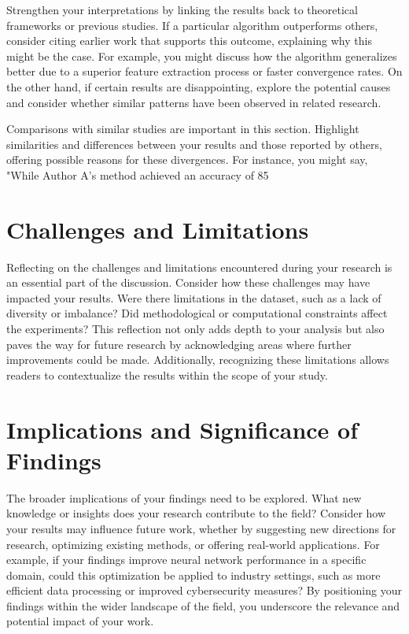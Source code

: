 \documentclass{iutbscthesis}
\begin{document}
Strengthen your interpretations by linking the results back to theoretical frameworks or previous studies. If a particular algorithm outperforms others, consider citing earlier work that supports this outcome, explaining why this might be the case. For example, you might discuss how the algorithm generalizes better due to a superior feature extraction process or faster convergence rates. On the other hand, if certain results are disappointing, explore the potential causes and consider whether similar patterns have been observed in related research.

Comparisons with similar studies are important in this section. Highlight similarities and differences between your results and those reported by others, offering possible reasons for these divergences. For instance, you might say, "While Author A's method achieved an accuracy of 85%

\section{Challenges and Limitations}

Reflecting on the challenges and limitations encountered during your research is an essential part of the discussion. Consider how these challenges may have impacted your results. Were there limitations in the dataset, such as a lack of diversity or imbalance? Did methodological or computational constraints affect the experiments? This reflection not only adds depth to your analysis but also paves the way for future research by acknowledging areas where further improvements could be made. Additionally, recognizing these limitations allows readers to contextualize the results within the scope of your study.

\section{Implications and Significance of Findings}

The broader implications of your findings need to be explored. What new knowledge or insights does your research contribute to the field? Consider how your results may influence future work, whether by suggesting new directions for research, optimizing existing methods, or offering real-world applications. For example, if your findings improve neural network performance in a specific domain, could this optimization be applied to industry settings, such as more efficient data processing or improved cybersecurity measures? By positioning your findings within the wider landscape of the field, you underscore the relevance and potential impact of your work.
\end{document}
